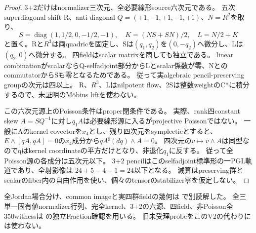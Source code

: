 \documentclass[a4paper,11pt]{ltjsarticle}
\theoremstyle{definition}
\begin{document}
\begin{proof}
3+2だけはnormalizer三次元、全必要線形source六次元である。
五次superdiagonal shift R、anti-diagonal $Q=(+1,-1,+1,-1,+1)$、$N=R^2$を取り、
\[
 S=\operatorname{diag}(1,1/2,0,-1/2,-1),\quad
 K=(NS+SN)/2,\quad L=N/2+K
\]
と置く。Rと$R^3$は両quadricを固定し、Sは$(q_1,q_2)$を$(0,-q_2)$へ微分し、Lは$(q_2,0)$へ微分する。
四fieldはscalar matrixを商しても独立である。
linear combinationがscalarならQ-selfadjoint部分からLとscalar係数が零、NとのcommutatorからSも零となるためである。
従って実algebraic pencil-preserving groupの次元は四以上。
R、$R^3$、Lはnilpotent flow、2Sは整数weightのC*に積分するので、未証明のM\"obius liftを使わない。

この六次元源上のPoisson条件はproper閉条件である。
実際、rank四constant skew $A=SQ^{-1}$に対し$q_1A$は必要線形源に入るがprojective Poissonではない。
一般にAのkernel covectorを$x_4$とし、残り四次元をsymplecticとすると、
$E\wedge[qA,qA]=0$の$x_4$成分から$qA^\sharp(dq)\wedge A=0$。
四次元の$v\mapsto v\wedge A$は同型なのでqはkernel coordinateの平方だけとなり、非退化$q_1$に反する。
従って全Poisson源の各成分は五次元以下。
3+2 pencilはこのselfadjoint標準形の一PGL軌道であり、全射影像は
$24+5-4-1=24$以下となる。
減算はpreserving群とscalarのfiber内の自由作用を使い、個々のtensorのstabilizer零を仮定しない。
\end{proof}
全Jordan場合分け、common imageと実四群fieldの幾何は
で別読解した。
全三単一固有値normalizer行列、完全kernel、3+2の六源、四field、非Poisson全350witnessは
の独立Fraction確認を用いる。
旧未受理probeをこのV2の代わりには使わない。
\end{document}
